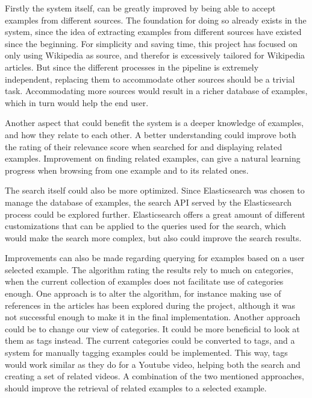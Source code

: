 Firstly the system itself, can be greatly improved by being able to accept examples from different sources. The foundation for doing so already exists in the system, since the idea of extracting examples from different sources have existed since the beginning. For simplicity and saving time, this project has focused on only using Wikipedia as source, and therefor is excessively tailored for Wikipedia articles. But since the different processes in the pipeline is extremely independent, replacing them to accommodate other sources should be a trivial task. Accommodating more sources would result in a richer database of examples, which in turn would help the end user.

Another aspect that could benefit the system is a deeper knowledge of examples, and how they relate to each other. A better understanding could improve both the rating of their relevance score when searched for and displaying related examples. Improvement on finding related examples, can give a natural learning progress when browsing from one example and to its related ones.

The search itself could also be more optimized. Since Elasticsearch was chosen to manage the database of examples, the search API served by the Elasticsearch process could be explored further. Elasticsearch offers a great amount of different customizations that can be applied to the queries used for the search, which would make the search more complex, but also could improve the search results.

Improvements can also be made regarding querying for examples based on a user selected example. The algorithm rating the results rely to much on categories, when the current collection of examples does not facilitate use of categories enough. One approach is to alter the algorithm, for instance making use of references in the articles has been explored during the project, although it was not successful enough to make it in the final implementation. Another approach could be to change our view of categories. It could be more beneficial to look at them as tags instead. The current categories could be converted to tags, and a system for manually tagging examples could be implemented. This way, tags would work similar as they do for a Youtube video, helping both the search and creating a set of related videos. A combination of the two mentioned approaches, should improve the retrieval of related examples to a selected example.


\cleardoublepage